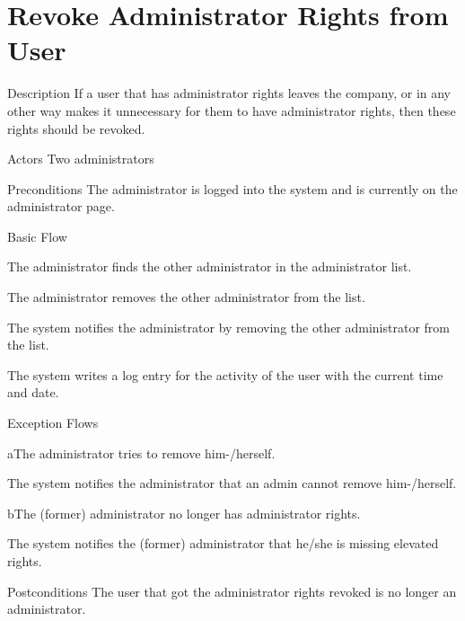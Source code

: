 \section{Revoke Administrator Rights from User}

%
\begin{cpart}{Description}
If a user that has administrator rights leaves the company, or in any other way makes it unnecessary for them to have administrator rights, then these rights should be revoked.
\end{cpart}


%
\begin{cpart}{Actors}
Two administrators
\end{cpart}

%
\begin{cpart}{Preconditions}
The administrator is logged into the system and is currently on the administrator page.
\end{cpart}

%
\begin{cpartList}{Basic Flow}
  \item The administrator finds the other administrator in the administrator list.
  \item The administrator removes the other administrator from the list.
  \item The system notifies the administrator by removing the other administrator from the list.
  \item The system writes a log entry for the activity of the user with the current time and date.
\end{cpartList}

%
\begin{cpartList}{Exception Flows}
  \begin{innerList}{2}{a}{The administrator tries to remove him-/herself.}
    \item The system notifies the administrator that an admin cannot remove him-/herself.
  \end{innerList}
  \begin{innerList}{2}{b}{The (former) administrator no longer has administrator rights.}
    \item The system notifies the (former) administrator that he/she is missing elevated rights.
  \end{innerList}
\end{cpartList}

%
\begin{cpart}{Postconditions}
The user that got the administrator rights revoked is no longer an administrator.
\end{cpart}

